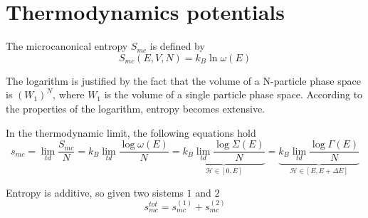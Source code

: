 \section{Thermodynamics potentials}

    The microcanonical entropy $S_{mc}$ is defined by 
    \begin{equation}\label{entropymc}
        S_{mc} (E, V, N) = k_B \ln \omega(E)
    \end{equation}

    The logarithm is justified by the fact that the volume of a N-particle phase space is $(W_1)^N$, where $W_1$ is the volume of a single particle phase space. According to the properties of the logarithm, entropy becomes extensive.

    In the thermodynamic limit, the following equations hold 
    \begin{equation*}
        s_{mc} = \lim_{td} \frac{S_{mc}}{N} = k_B \lim_{td} \frac{\log \omega(E)}{N} = \underbrace{k_B \lim_{td} \frac{\log \Sigma(E)}{N}}_{\mathcal H \in [0, E]} = \underbrace{k_B \lim_{td} \frac{\log \Gamma(E)}{N}}_{\mathcal H \in [E, E + \Delta E]}
    \end{equation*}

    Entropy is additive, so given two sistems $1$ and $2$
    \begin{equation*}
        s_{mc}^{tot} = s_{mc}^{(1)} + s_{mc}^{(2)}
    \end{equation*}

